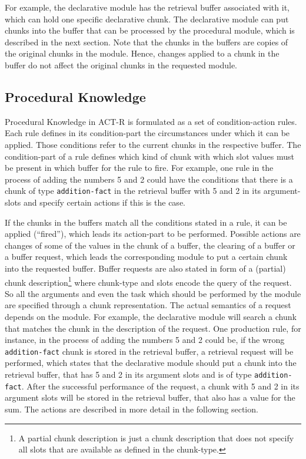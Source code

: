 For example, the declarative module has the retrieval buffer associated with it, which can hold one specific declarative chunk. The declarative module can put chunks into the buffer that can be processed by the procedural module, which is described in the next section. Note that the chunks in the buffers are copies of the original chunks in the module. Hence, changes applied to a chunk in the buffer do not affect the original chunks in the requested module. 

\subsection{Procedural Knowledge}
\label{procedural_knowledge}

Procedural Knowledge in ACT-R is formulated as a set of condition-action rules. Each rule defines in its condition-part the circumstances under which it can be applied. Those conditions refer to the current chunks in the respective buffer. The condition-part of a rule defines which kind of chunk with which slot values must be present in which buffer for the rule to fire. For example, one rule in the process of adding the numbers 5 and 2 could have the conditions that there is a chunk of type \verb|addition-fact| in the retrieval buffer with 5 and 2 in its argument-slots and specify certain actions if this is the case.

If the chunks in the buffers match all the conditions stated in a rule, it can be applied (``fired''), which leads its action-part to be performed. Possible actions are changes of some of the values in the chunk of a buffer, the clearing of a buffer or a buffer request, which leads the corresponding module to put a certain chunk into the requested buffer. Buffer requests are also stated in form of a (partial) chunk description\footnote{A partial chunk description is just a chunk description that does not specify all slots that are available as defined in the chunk-type.} where chunk-type and slots encode the query of the request. So all the arguments and even the task which should be performed by the module are specified through a chunk representation. The actual semantics of a request depends on the module. For example, the declarative module will search a chunk that matches the chunk in the description of the request. One production rule, for instance, in the process of adding the numbers 5 and 2 could be, if the wrong \verb|addition-fact| chunk is stored in the retrieval buffer, a retrieval request will be performed, which states that the declarative module should put a chunk into the retrieval buffer, that has 5 and 2 in its argument slots and is of type \verb|addition-fact|. After the successful performance of the request, a chunk with 5 and 2 in its argument slots will be stored in the retrieval buffer, that also has a value for the sum. The actions are described in more detail in the following section.

